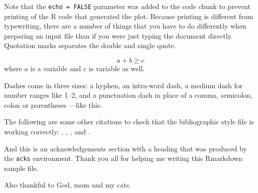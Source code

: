\documentclass[ba]{imsart}
\numberwithin{equation}{section}
\theoremstyle{plain}
\begin{document}
Note that the \texttt{echo\ =\ FALSE} parameter was added to the code chunk to prevent printing of the R code that generated the plot. Because printing is different from typewriting, there are a number of things that you have to do differently when preparing an input file than if you were just typing the document directly. Quotation marks separates the double and single quote.

\[a+b\geq c\]
where \(a\) is a variable and \(c\) is variable as well.

Dashes come in three sizes: a hyphen, an intra-word dash, a medium dash for number ranges like 1--2, and a punctuation dash in place of a comma, semicolon, colon or parentheses ---like this.

The following are some other citations to check that the bibliographic style file is working correctly: \citet{akaike}, \citet*{akivarsq},
\citet*{kstuart}, and \citet{companion}.

\begin{supplement}
\end{supplement}
\begin{supplement}
\end{supplement}

\begin{acks}[Acknowledgments]
And this is an acknowledgements section with a heading that was produced by the \texttt{acks} environment. Thank you all for helping me writing this Rmarkdown sample file.

Also thankful to God, mom and my cats.
\end{acks}



\end{document}
